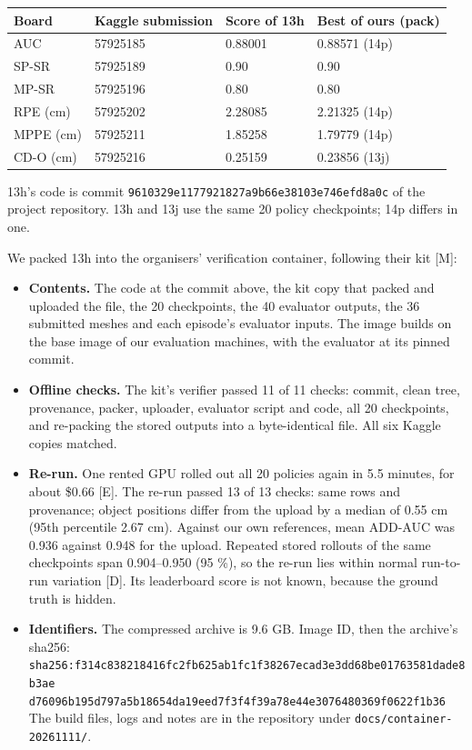 \documentclass[11pt]{article}
\begin{document}
\begin{center}\small
\begin{tabularx}{\linewidth}{lllX}
\toprule
\textbf{Board} & \textbf{Kaggle submission} & \textbf{Score of 13h} & \textbf{Best of ours (pack)} \\
\midrule
AUC & 57925185 & 0.88001 & 0.88571 (14p) \\
SP-SR & 57925189 & 0.90 & 0.90 \\
MP-SR & 57925196 & 0.80 & 0.80 \\
RPE (cm) & 57925202 & 2.28085 & 2.21325 (14p) \\
MPPE (cm) & 57925211 & 1.85258 & 1.79779 (14p) \\
CD-O (cm) & 57925216 & 0.25159 & 0.23856 (13j) \\
\bottomrule
\end{tabularx}
\end{center}
13h's code is commit {\footnotesize\texttt{9610329e1177921827a9b66e38103e746efd8a0c}} of the project repository. 13h and 13j use the same 20 policy checkpoints; 14p differs in one.

We packed 13h into the organisers' verification container, following their kit {[}M{]}:
\begin{itemize}[itemsep=2pt,topsep=3pt]
\item \textbf{Contents.} The code at the commit above, the kit copy that packed and uploaded the file, the 20 checkpoints, the 40 evaluator outputs, the 36 submitted meshes and each episode's evaluator inputs. The image builds on the base image of our evaluation machines, with the evaluator at its pinned commit.
\item \textbf{Offline checks.} The kit's verifier passed 11 of 11 checks: commit, clean tree, provenance, packer, uploader, evaluator script and code, all 20 checkpoints, and re-packing the stored outputs into a byte-identical file. All six Kaggle copies matched.
\item \textbf{Re-run.} One rented GPU rolled out all 20 policies again in 5.5 minutes, for about \$0.66 {[}E{]}. The re-run passed 13 of 13 checks: same rows and provenance; object positions differ from the upload by a median of 0.55 cm (95th percentile 2.67 cm). Against our own references, mean ADD-AUC was 0.936 against 0.948 for the upload. Repeated stored rollouts of the same checkpoints span 0.904--0.950 (95 \%), so the re-run lies within normal run-to-run variation {[}D{]}. Its leaderboard score is not known, because the ground truth is hidden.
\item \textbf{Identifiers.} The compressed archive is 9.6 GB. Image ID, then the archive's sha256:\\
{\footnotesize\texttt{sha256:f314c838218416fc2fb625ab1fc1f38267ecad3e3dd68be01763581dade8b3ae}}\\
{\footnotesize\texttt{d76096b195d797a5b18654da19eed7f3f4f39a78e44e3076480369f0622f1b36}}\\
The build files, logs and notes are in the repository under \texttt{docs/container-20261111/}.
\end{itemize}
\end{document}
